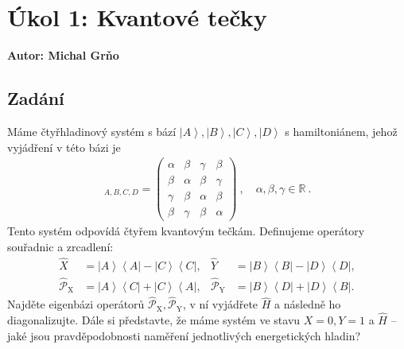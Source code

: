 \documentclass{article}
\newcommand{\const}[1]{\text{#1}}
\newcommand{\bra}[1]{\left< #1 \right|}
\newcommand{\ket}[1]{\left| #1 \right>}
\newcommand{\Parity}{\hat{\mathcal{P}}}
\newcommand{\R}{\mathbb{R}}
\newcommand{\mat}[1]{
    \begin{pmatrix}
        #1
    \end{pmatrix}
}
\begin{document}
\section*{Úkol 1: Kvantové tečky}
\textbf{Autor: Michal Grňo}

\subsection*{Zadání}
Máme čtyřhladinový systém s bází $\ket{A}, \ket{B}, \ket{C}, \ket{D}$ s hamiltoniánem, jehož vyjádření v této bázi je
\begin{align*}
    [ \hat H ]_{A,B,C,D}
    =
    \mat{
        \alpha & \beta & \gamma & \beta \\
        \beta & \alpha & \beta & \gamma \\
        \gamma & \beta & \alpha & \beta \\
        \beta & \gamma & \beta & \alpha
    } \: ,
    \quad
    \alpha, \beta, \gamma \in \R \: .
\end{align*}
Tento systém odpovídá čtyřem kvantovým tečkám. Definujeme operátory souřadnic a zrcadlení:
\begin{align*}
    \hat X &= \ket{A}\bra{A} - \ket{C}\bra{C}, &
    \hat Y &= \ket{B}\bra{B} - \ket{D}\bra{D}, \\
    \Parity_\const{X} &= \ket{A}\bra{C} + \ket{C}\bra{A}, &
    \Parity_\const{Y} &= \ket{B}\bra{D} + \ket{D}\bra{B}.
\end{align*}
Najděte eigenbázi operátorů $\Parity_\const{X}, \Parity_\const{Y}$, v ní vyjádřete $\hat H$ a následně ho diagonalizujte. Dále si představte, že máme systém ve stavu $X=0, Y=1$ a $\hat H$ – jaké jsou pravděpodobnosti naměření jednotlivých energetických hladin?
\end{document}
